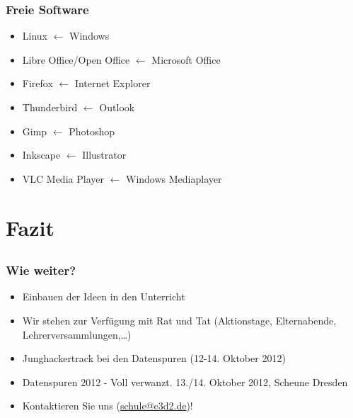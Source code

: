 \documentclass{beamer}
\begin{document}
\begin{frame}
  \frametitle{Freie Software}
  \begin{itemize}
  \item Linux $ \gets $ Windows
    \item Libre Office/Open Office $ \gets $ Microsoft Office
    \item Firefox $ \gets $ Internet Explorer
    \item Thunderbird $ \gets $ Outlook
    \item Gimp $ \gets $ Photoshop
    \item Inkscape $ \gets $ Illustrator
    \item VLC Media Player $ \gets $ Windows Mediaplayer
  \end{itemize}
\end{frame}

\section{Fazit}
\subsection{}

\begin{frame}
  \frametitle{Wie weiter?}
  \begin{itemize}
    \item<2-> Einbauen der Ideen in den Unterricht
    \item<3-> Wir stehen zur Verfügung mit Rat und Tat (Aktionstage, Elternabende, Lehrerversammlungen,\ldots)
    \item<4-> Junghackertrack bei den Datenspuren (12-14. Oktober 2012)
    \item<5-> Datenspuren 2012 - Voll verwanzt. 13./14. Oktober 2012, Scheune Dresden
    \item<6-> Kontaktieren Sie uns (\url{schule@c3d2.de})!
  \end{itemize}
\end{frame}
\end{document}
